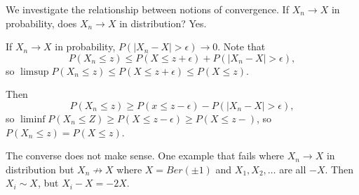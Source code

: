 \documentclass[11pt]{scrartcl}
\begin{document}
We investigate the relationship between notions of convergence.  If $X_n \rightarrow X$ in probability, does $X_n \rightarrow X$ in distribution? Yes.

If $X_n \rightarrow X$ in probability, $P(|X_n -X| > \epsilon) \rightarrow 0$.  Note that 
$$P(X_n \le z) \le P(X \le z+\epsilon) + P(|X_n - X| > \epsilon),$$
so $\limsup P(X_n \le z) \le P(X \le z + \epsilon) \le P(X \le z)$.

Then $$P(X_n \le z) \ge P(x \le z-\epsilon) - P(|X_n - X| > \epsilon),$$so $\liminf P(X_n \le Z) \ge P(X \le z - \epsilon) \ge P(X \le z-)$, so $P(X_n \le z) = P(X \le z)$.

The converse does not make sense.  One example that fails where $X_n \rightarrow X$ in distribution but $X_n \not \rightarrow X$ where $X = Ber(\pm 1)$ and $X_1, X_2, \dots$ are all $-X$.  Then $X_i \sim X$, but $X_i - X = -2X$.  
\end{document}
